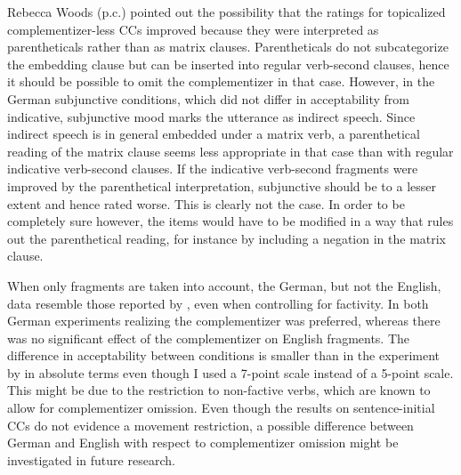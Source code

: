 Rebecca Woods (p.c.) pointed out the possibility that the ratings for topicalized complementizer-less CCs improved because they were interpreted as parentheticals rather than as matrix clauses. Parentheticals do not subcategorize the embedding clause but can be inserted into regular verb-second clauses, hence it should be possible to omit the complementizer in that case. However, in the German subjunctive conditions, which did not differ in acceptability from indicative, subjunctive mood marks the utterance as indirect speech. Since indirect speech is in general embedded under a matrix verb, a parenthetical reading of the matrix clause seems less appropriate in that case than with regular indicative verb-second clauses. If the indicative verb-second fragments were improved by the parenthetical interpretation, subjunctive should be to a lesser extent and hence rated worse. This is clearly not the case. In order to be completely sure however, the items would have to be modified in a way that rules out the parenthetical reading, for instance by including a negation in the matrix clause.

When only fragments are taken into account, the German, but not the English, data resemble those reported by \citet{merchant.etal2013}, even when controlling for factivity. In both German experiments realizing the complementizer was preferred, whereas there was no significant effect of the complementizer on English fragments. The difference in acceptability between conditions is smaller than in the experiment by \citet{merchant.etal2013} in absolute terms even though I used a 7-point scale instead of a 5-point scale. This might be due to the restriction to non-factive verbs, which are known to allow for complementizer omission. Even though the results on sentence-initial CCs do not evidence a movement restriction, a possible difference between German and English with respect to complementizer omission might be investigated in future research.


